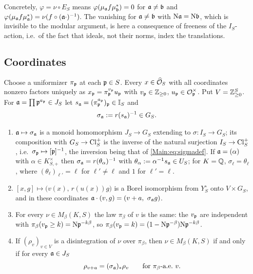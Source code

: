 \begin{remark}
Concretely, $\varphi=\nu\circ E_S$ means $\varphi(\mu_{\mathfrak{a}} f\mu_{\mathfrak{b}}^*)=0$ for
$\mathfrak{a}\neq\mathfrak{b}$ and $\varphi(\mu_{\mathfrak{a}} f\mu_{\mathfrak{a}}^*)=\nu(f\circ(\mathfrak{a}\cdot)^{-1})$.
The vanishing for $\mathfrak{a}\neq\mathfrak{b}$ with $\mathrm{N}\mathfrak{a}=\mathrm{N}\mathfrak{b}$, which is invisible to the
modular argument, is here a consequence of freeness of the $I_S$-action, i.e.\
of the fact that ideals, not their norms, index the translations.
\end{remark}

\subsection{Coordinates}

Choose a uniformizer $\pi_{\mathfrak{p}}$ at each $\mathfrak{p}\in S$. Every $x\in\widehat{\mathcal{O}}_S$ with all
coordinates nonzero factors uniquely as $x_{\mathfrak{p}}=\pi_{\mathfrak{p}}^{v_{\mathfrak{p}}}u_{\mathfrak{p}}$ with
$v_{\mathfrak{p}}\in\mathbb{Z}_{\ge0}$, $u_{\mathfrak{p}}\in\mathcal{O}_{\mathfrak{p}}^\times$. Put $V=\mathbb{Z}_{\ge0}^S$. For
$\mathfrak{a}=\prod\mathfrak{p}^{a_{\mathfrak{p}}}\in J_S$ let $s_{\mathfrak{a}}=(\pi_{\mathfrak{p}}^{a_{\mathfrak{p}}})_{\mathfrak{p}}\in\mathbb{I}_S$ and
\begin{equation}\label{Main:eq:sigmadef}
\sigma_{\mathfrak{a}}:=r(s_{\mathfrak{a}})^{-1}\in G_S .
\end{equation}

\begin{lemma}\label{Main:lem:coords}
\begin{enumerate}
\item $\mathfrak{a}\mapsto\sigma_{\mathfrak{a}}$ is a monoid homomorphism $J_S\to G_S$ extending
to $\sigma:I_S\to G_S$; its composition with $G_S\to\operatorname{Cl}^+_S$ is the inverse of the natural
surjection $I_S\to\operatorname{Cl}^+_S$, i.e.\ $\sigma_{\mathfrak{p}}\mapsto[\mathfrak{p}]^{-1}$, the inversion being that of
\eqref{Main:eq:sigmadef}. If $\mathfrak{a}=(\alpha)$ with $\alpha\in K^\times_{S,+}$ then
$\sigma_{\mathfrak{a}}=r(\theta_\alpha)^{-1}$ with $\theta_\alpha:=\alpha^{-1}s_{\mathfrak{a}}\in U_S$; for
$K=\mathbb{Q}$, $\sigma_\ell=\theta_\ell$, where $(\theta_\ell)_{\ell'}=\ell$ for $\ell'\neq\ell$
and $1$ for $\ell'=\ell$.
\item $[x,g]\mapsto\bigl(v(x),\,r(u(x))g\bigr)$ is a Borel isomorphism from
$Y_S^\circ$ onto $V\times G_S$, and in these coordinates
$\mathfrak{a}\cdot(v,g)=(v+a,\ \sigma_{\mathfrak{a}} g)$.
\item For every $\nu\in M_\beta(K,S)$ the law $\pi_\beta$ of $v$ is the same:
the $v_{\mathfrak{p}}$ are independent with $\pi_\beta(v_{\mathfrak{p}}\ge k)=\mathrm{N}\mathfrak{p}^{-k\beta}$, so
$\pi_\beta(v_{\mathfrak{p}}=k)=(1-\mathrm{N}\mathfrak{p}^{-\beta})\mathrm{N}\mathfrak{p}^{-k\beta}$.
\item If $(\rho_v)_{v\in V}$ is a disintegration of $\nu$ over $\pi_\beta$,
then $\nu\in M_\beta(K,S)$ if and only if for every $\mathfrak{a}\in J_S$
\begin{equation}\label{Main:eq:coc}
\rho_{v+a}=(\sigma_\aaa)_*\rho_v\qquad\text{for }\pi_\beta\text{-a.e.\ }v .
\end{equation}
\end{enumerate}
\end{lemma}

